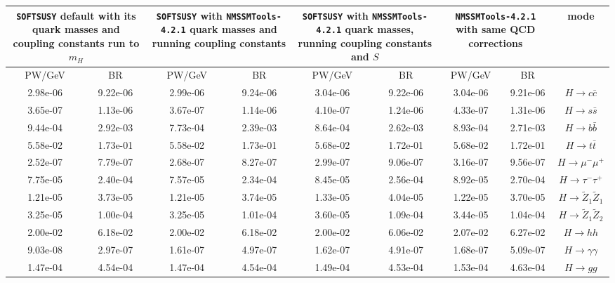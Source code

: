 \documentclass[final,3p,times,pdflatex]{elsarticle}
\begin{document}
\begin{center}
\begin{table} %
\centering
\begin{tabular}{|c|c|c|c|c|c|c|c|c|} \hline
\multicolumn{2}{|C{3.0cm}|}{{\tt SOFTSUSY} default with its quark masses and coupling constants run to $m_{H}$} & \multicolumn{2}{C{3.0cm}|}{{\tt SOFTSUSY} with {\tt NMSSMTools-4.2.1} quark masses and running coupling constants} &
\multicolumn{2}{C{3.0cm}|}{{\tt SOFTSUSY} with {\tt NMSSMTools-4.2.1} quark masses, running coupling constants and $S$} & \multicolumn{2}{C{3.0cm}|}{{\tt NMSSMTools-4.2.1} with same QCD corrections} & mode \\ \hline
PW/GeV & BR & PW/GeV & BR & PW/GeV & BR & PW/GeV & BR & \\ \hline
2.98e-06 & 9.22e-06 & 2.99e-06 & 9.24e-06 & 3.04e-06 & 9.22e-06 & 3.04e-06 & 9.21e-06 & $H \rightarrow c \bar{c}$ \\ \hline
3.65e-07 & 1.13e-06 & 3.67e-07 & 1.14e-06 & 4.10e-07 & 1.24e-06 & 4.33e-07 & 1.31e-06 & $H \rightarrow s \bar{s}$ \\ \hline
9.44e-04 & 2.92e-03 & 7.73e-04 & 2.39e-03 & 8.64e-04 & 2.62e-03 & 8.93e-04 & 2.71e-03 & $H \rightarrow b \bar{b}$ \\ \hline
5.58e-02 & 1.73e-01 & 5.58e-02 & 1.73e-01 & 5.68e-02 & 1.72e-01 & 5.68e-02 & 1.72e-01 & $H \rightarrow t \bar{t}$ \\ \hline
2.52e-07 & 7.79e-07 & 2.68e-07 & 8.27e-07 & 2.99e-07 & 9.06e-07 & 3.16e-07 & 9.56e-07 & $H \rightarrow \mu^- \mu^+$ \\ \hline
7.75e-05 & 2.40e-04 & 7.57e-05 & 2.34e-04 & 8.45e-05 & 2.56e-04 & 8.92e-05 & 2.70e-04 & $H \rightarrow \tau^- \tau^+$ \\ \hline
1.21e-05 & 3.73e-05 & 1.21e-05 & 3.74e-05 & 1.33e-05 & 4.04e-05 & 1.22e-05 & 3.70e-05 & $H \rightarrow \tilde{Z}_1 \tilde{Z}_1$  \\ \hline
3.25e-05 & 1.00e-04 & 3.25e-05 & 1.01e-04 & 3.60e-05 & 1.09e-04 & 3.44e-05 & 1.04e-04 & $H \rightarrow \tilde{Z}_1 \tilde{Z}_2$ \\ \hline
2.00e-02 & 6.18e-02 & 2.00e-02 & 6.18e-02 & 2.00e-02 & 6.06e-02 & 2.07e-02 & 6.27e-02 & $H \rightarrow h h$ \\ \hline
9.03e-08 & 2.97e-07 & 1.61e-07 & 4.97e-07 & 1.62e-07 & 4.91e-07 & 1.68e-07 & 5.09e-07 & $H \rightarrow \gamma \gamma$ \\ \hline
1.47e-04 & 4.54e-04 & 1.47e-04 & 4.54e-04 & 1.49e-04 & 4.53e-04 & 1.53e-04 & 4.63e-04 & $H \rightarrow g g$ \\ \hline

\end{tabular}
\end{table}
\end{center}
\end{document}
